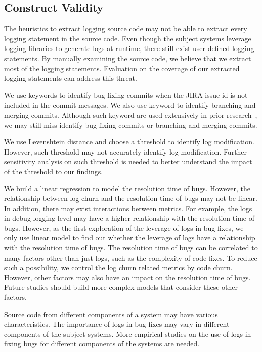 \documentclass[conference]{IEEEtran}
\providecommand{\DIFadd}[1]{{\protect\color{blue}\uwave{#1}}} %
\providecommand{\DIFdel}[1]{{\protect\color{red}\sout{#1}}}                      %
\providecommand{\DIFaddbegin}{} %
\providecommand{\DIFaddend}{} %
\providecommand{\DIFdelbegin}{} %
\providecommand{\DIFdelend}{} %
\begin{document}
\subsection*{Construct Validity}

The heuristics to extract logging source code may not be able to extract every logging statement in the source code. Even though the subject systems leverage logging libraries to generate logs at runtime, there still exist user-defined logging statements. By manually examining the source code, we believe that we extract most of the logging statements. Evaluation on the coverage of our extracted logging statements can address this threat.

We use keywords to identify bug fixing commits when the JIRA issue id is not included in the commit messages. We also use \DIFdelbegin \DIFdel{keyword }\DIFdelend \DIFaddbegin \DIFadd{keywords }\DIFaddend to identify branching and merging commits. Although such \DIFdelbegin \DIFdel{keyword }\DIFdelend \DIFaddbegin \DIFadd{keywords }\DIFaddend are used extensively in prior research~\cite{EMSEIAN}, we may still miss identify bug fixing commits or branching and merging commits. 

We  use Levenshtein distance and choose a threshold to identify log modification. However, such threshold may not accurately identify log modification. Further sensitivity analysis on such threshold is needed to better understand the impact of the threshold to our findings.

We build a linear regression to model the resolution time of bugs. However, the relationship between log churn and the resolution time of bugs may not be linear. In addition, there may exist interactions between metrics. For example, the logs in debug logging level may have a higher relationship with the resolution time of bugs. However, as the first exploration of the leverage of logs in bug fixes, we only use linear model to find out whether the leverage of logs have a relationship with the resolution time of bugs. The resolution time of bugs can be correlated to many factors other than just logs, such as the complexity of code fixes. To reduce such a possibility, we control the log churn related metrics by code churn. However, other factors may also have an impact on the resolution time of bugs. Future studies should build more complex models that consider these other factors.


Source code from different components of a system may have various characteristics. The importance of logs in bug fixes may vary in different components of the subject systems. More empirical studies on the use of logs in fixing bugs for different components of the systems are needed.
\end{document}
